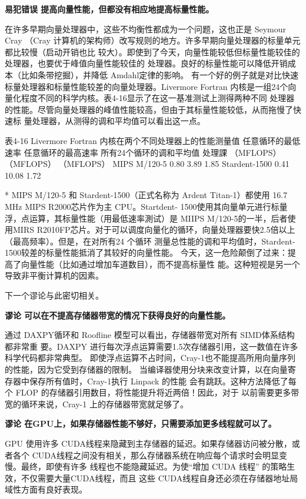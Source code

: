 \textbf{易犯错误 提高向量性能，但都没有相应地提高标量性能。}

在许多早期向量处理器中，这些不均衡性都成为一个问题，这也正是 Seymour Cray （Cray
计算机的架构师）改写规则的地方。许多早期向量处理器的标量单元都比较慢（启动开销也比
较大）。即使到了今天，向量性能较低但标量性能较佳的处理器，也要优于峰值向量性能较佳的
处理器。良好的标量性能可以降低开销成本（比如条带挖掘），并降低 Amdahl定律的影响。
有一个好的例子就是对比快速标量处理器和标量性能较差的向量处理器。Livermore Fortran
内核是一组24个向量化程度不同的科学内核。表4-16显示了在这一基准测试上测得两种不同
处理器的性能。尽管向量处理器的峰值性能较高，但由于其标量性能较低，从而拖慢了快速标
量处理器，从测得的调和平均值可以看出这一点。

表4-16 Livermore Fortran 内核在两个不同处理器上的性能测量值
任意循环的最低速率
任意循环的最高速率 所有24个循环的调和平均值
处理課
（MFLOPS）
（MFLOPS）
（MFLOPS）
MIPS M/120-5
0.80
3.89
1.85
Stardent-1500
0.41
10.08
1.72

* MIPS M/120-5 和 Stardent-1500（正式名称为 Ardent Titan-1）都使用 16.7 MHz MIPS R2000芯片作为主 CPU。Startdent-
1500使用其向量单元进行标量浮，点运算，其标量性能（用最低速率測试）是 MIIPS M/120-5的一半，后者使用MIRS
R2010FP芯片。对于可以调度向量化的循环，向量处理器要快2.5倍以上（最高频率）。但是，在对所有24 个循环
测量总性能的调和平均值时，Stardent-1500较差的标量性能抵消了其较好的向量性能。
今天，这一危险颠倒了过来：提高了向量性能（比如通过增加车道数目），而不提高标量性
能。这种短视是另一个导致非平衡计算机的因素。

下一个谬论与此密切相关。

\textbf{谬论 可以在不提高存储器带宽的情况下获得良好的向量性能。}

通过 DAXPY循环和 Roofline 模型可以看出，存储器带宽对所有 SIMD体系结构都非常重
要。DAXPY 进行每次浮点运算需要1.5次存储器引用，这一数值在许多科学代码都非常典型。
即使浮点运算不占时间，Cray-1也不能提高所用向量序列的性能，因为它受到存储器的限制。
当编译器使用分块来改变计算，以在向量寄存器中保存所有值时，Cray-1执行 Linpack 的性能
会有跳跃。这种方法降低了每个 FLOP 的存储器引用数目，将性能提升将近两倍！因此，对于
以前需要更多带宽的循环来说，Cray-1 上的存储器带宽就足够了。

\textbf{谬论 在GPU上，如果存储器性能不够好，只需要添加更多线程就可以了。}

GPU 使用许多 CUDA线程来隐藏到主存储器的延迟。如果存储器访问被分散，或者各个
CUDA线程之间没有相关，那么存储器系统在响应每个请求时会明显变慢。最终，即使有许多
线程也不能隐藏延迟。为使“增加 CUDA 线程” 的策略生效，不仅需要大量CUDA线程，而且
这些 CUDA线程自身还必须在存储器地址局域性方面有良好表现。
